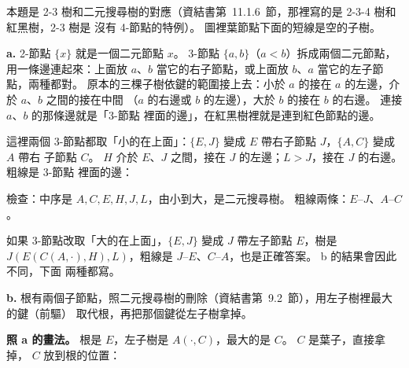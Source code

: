 \begin{pastsoln}
本題是 2-3 樹和二元搜尋樹的對應（資結書第~11.1.6~節，那裡寫的是 2-3-4 樹和紅黑樹，2-3 樹是
沒有 4-節點的特例）。 圖裡葉節點下面的短線是空的子樹。

\textbf{a.} 2-節點 $\{x\}$ 就是一個二元節點 $x$。 3-節點 $\{a, b\}$（$a < b$）拆成兩個二元節點，
用一條邊連起來：上面放 $a$、$b$ 當它的右子節點，或上面放 $b$、$a$ 當它的左子節點，兩種都對。
原本的三棵子樹依鍵的範圍接上去：小於 $a$ 的接在 $a$ 的左邊，介於 $a$、$b$ 之間的接在中間
（$a$ 的右邊或 $b$ 的左邊），大於 $b$ 的接在 $b$ 的右邊。 連接 $a$、$b$ 的那條邊就是「3-節點
裡面的邊」，在紅黑樹裡就是連到紅色節點的邊。

這裡兩個 3-節點都取「小的在上面」：$\{E, J\}$ 變成 $E$ 帶右子節點 $J$，$\{A, C\}$ 變成 $A$ 帶右
子節點 $C$。 $H$ 介於 $E$、$J$ 之間，接在 $J$ 的左邊；$L > J$，接在 $J$ 的右邊。 粗線是 3-節點
裡面的邊：

\begin{center}
\end{center}
檢查：中序是 $A, C, E, H, J, L$，由小到大，是二元搜尋樹。 粗線兩條：$E$--$J$、$A$--$C$。

如果 3-節點改取「大的在上面」，$\{E, J\}$ 變成 $J$ 帶左子節點 $E$，樹是
$J(E(C(A, \cdot), H), L)$，粗線是 $J$--$E$、$C$--$A$，也是正確答案。 b 的結果會因此不同，下面
兩種都寫。

\textbf{b.} 根有兩個子節點，照二元搜尋樹的刪除（資結書第~9.2~節），用左子樹裡最大的鍵（前驅）
取代根，再把那個鍵從左子樹拿掉。

\textbf{照 a 的畫法。} 根是 $E$，左子樹是 $A(\cdot, C)$，最大的是 $C$。 $C$ 是葉子，直接拿掉，
$C$ 放到根的位置：


\end{pastsoln}
